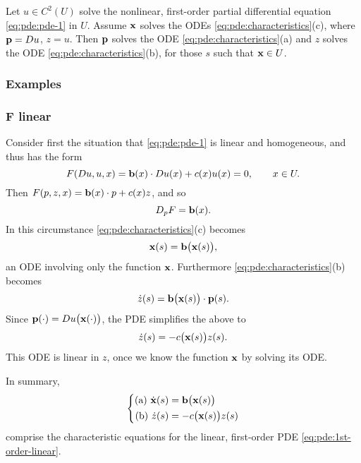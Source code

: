 \begin{theorem}
  Let \(u\in C^2(U)\) solve the nonlinear, first-order partial differential
  equation \eqref{eq:pde:pde-1} in \(U\). Assume \(\mathbf{x}\) solves the ODEs
  \eqref{eq:pde:characteristics}\textnormal{(c)}, where \(\mathbf{p}=Du\),
  \(z=u\). Then \(\mathbf{p}\) solves the ODE
  \eqref{eq:pde:characteristics}\textnormal{(a)} and \(z\) solves the ODE
  \eqref{eq:pde:characteristics}\textnormal{(b)}, for those \(s\) such that
  \(\mathbf{x}\in U\).
\end{theorem}
\subsubsection{Examples}
\subsubsection[\(F\) linear]{\(\boldsymbol F\)  linear}
Consider first the situation that \eqref{eq:pde:pde-1} is linear and
homogeneous, and thus has the form
\[
  F(Du,u,x)=\mathbf{b}(x)\cdot D u(x)+c(x)u(x)=0,\qquad x\in U.
\]
Then \(F(p,z,x)=\mathbf{b}(x)\cdot p+c(x)z\), and so
\[
  D_pF=\mathbf{b}(x).
\]
In this circumstance \eqref{eq:pde:characteristics}(c) becomes
\[
  \mathbf{x}(s)=\mathbf{b}\bigl(\mathbf{x}(s)\bigr),
\]
an ODE involving only the function \(\mathbf{x}\). Furthermore
\eqref{eq:pde:characteristics}(b) becomes
\begin{equation}
  \label{eq:pde:1st-order-linear}
  \dot z(s)=\mathbf{b}\bigl(\mathbf{x}(s)\bigr)\cdot\mathbf{p}(s).
\end{equation}
Since \(\mathbf{p}(\cdot)=Du\bigl(\mathbf{x}(\cdot)\bigr)\), the PDE simplifies the
above to
\[
  \dot z(s)=-c\bigl(\mathbf{x}(s)\bigr)z(s).
\]
This ODE is linear in \(z\), once we know the function \(\mathbf{x}\) by solving
its ODE.

In summary,
\begin{equation}
  \label{eq:pde:1st-order-linear-chars}
  \left\{
    \begin{aligned}
      \text{(a) }\dot{\mathbf{x}}(s)&=\mathbf{b}\bigl( \mathbf{x}(s) \bigr)\\
      \text{(b) }\dot z(s)&=-c\bigl(\mathbf{x}(s)\bigr)z(s)
    \end{aligned}
  \right.
\end{equation}
comprise the characteristic equations for the linear, first-order PDE
\eqref{eq:pde:1st-order-linear}.

